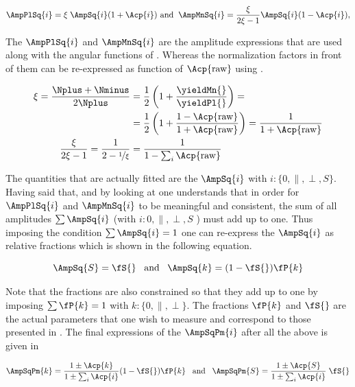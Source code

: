 \begin{equation}
\AmpPlSq{i} = \xi \; \AmpSq{i} (1+\Acp{i}) \,\, \text{and}\;\; \AmpMnSq{i} = \frac{\xi}{2\xi-1} \AmpSq{i} (1-\Acp{i}),
\label{acp_free}
\end{equation}

\noindent The $\AmpPlSq{i}$ and $\AmpMnSq{i}$ are the amplitude expressions that are used along with the angular functions of .
Whereas the normalization factors in front of them can be re-expressed as function of $\Acp{\text{raw}}$ using .

\begin{align}
\xi = \frac{\Nplus+\Nminus}{2\Nplus} &= \frac{1}{2}\left( 1 + \frac{\yieldMn{}}{\yieldPl{}}\right) = \nonumber \\ 
                                     &= \frac{1}{2}\left( 1 + \frac{1-\Acp{\text{raw}}}{1+\Acp{\text{raw}}}\right) =
                                        \frac{1}{1+\Acp{\text{raw}}}  \\
\frac{\xi}{2\xi-1} = \frac{1}{2-\nicefrac{1}{\xi}} &= \frac{1}{1-\sum_i\Acp{\text{raw}}}
\label{amp_norms}
\end{align}

The quantities that are actually fitted are the $\AmpSq{i}$ with $i:\{0,\parallel,\perp,S\}$. Having said that, and by looking at 
one understands that in order for $\AmpPlSq{i}$ and $\AmpMnSq{i}$ to be meaningful and consistent, the sum of all amplitudes $\sum\AmpSq{i}$ 
(with $i:{0,\parallel,\perp,S}$ ) must add up to one. Thus imposing the condition $\sum\AmpSq{i} = 1$ one can re-express the $\AmpSq{i}$
as relative fractions which is shown in the following equation.

\begin{equation}
\AmpSq{S} = \fS{} \;\;\;\text{and}\;\;\; \AmpSq{k} = (1-\fS{})\fP{k}
\label{amps_param}
\end{equation}

Note that the \pwave fractions are also constrained so that they add up to one by imposing $\sum\fP{k}=1$ with $k:\{0,\parallel,\perp\}$.
The fractions $\fP{k}$ and $\fS{}$ are the actual parameters that one wish to measure and correspond to those presented in .
The final expressions of the $\AmpSqPm{i}$ after all the above is given in 

\begin{equation}
\AmpSqPm{k} = \frac{1\pm\Acp{k}}{1\pm\sum_i\Acp{i}}  (1-\fS{})\fP{k}  \;\;\; \text{and}\;\;\; \AmpSqPm{S} = \frac{1\pm\Acp{S}}{1\pm\sum_i\Acp{i}} \; \fS{}
\label{amps_final}
\end{equation}


